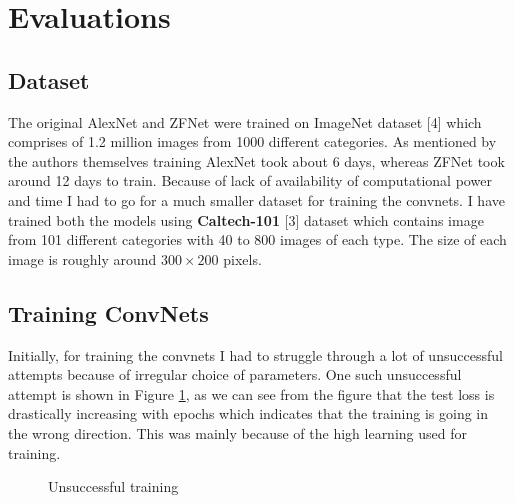 \documentclass{article} %
\begin{document}
	
	\section{Evaluations}
	\subsection{Dataset}
	The original AlexNet and ZFNet were trained on ImageNet dataset [4] which comprises of 1.2 million images from 1000 different categories. As mentioned by the authors themselves training AlexNet took about 6 days, whereas ZFNet took around 12 days to train. Because of lack of availability of computational power and time I had to go for a much smaller dataset for training the convnets. I have trained both the models using \textbf{Caltech-101} [3] dataset which contains image from 101 different categories with 40 to 800 images of each type. The size of each image is roughly around $300 \times 200$ pixels. 
	
	\subsection{Training ConvNets}
	Initially, for training the convnets I had to struggle through a lot of unsuccessful attempts because of irregular choice of parameters. One such unsuccessful attempt is shown in Figure \ref{c_train}, as we can see from the figure that the test loss is drastically increasing with epochs which indicates that the training is going in the wrong direction. This was mainly because of the high learning used for training. 
	
	\begin{figure}[h]
		\centering
		\caption{Unsuccessful training}
		\label{c_train}
	\end{figure}
	
\end{document}
